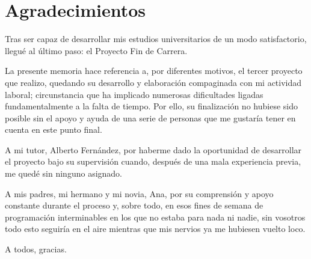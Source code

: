 \chapter{Agradecimientos}

Tras ser capaz de desarrollar mis estudios universitarios de un modo satisfactorio, llegué al último paso: el Proyecto Fin de Carrera.

La presente memoria hace referencia a, por diferentes motivos, el tercer proyecto que realizo, quedando su desarrollo y elaboración compaginada con mi actividad laboral; circunstancia que ha implicado numerosas dificultades ligadas fundamentalmente a la falta de tiempo. Por ello, su finalización no hubiese sido posible sin el apoyo y ayuda de una serie de personas que me gustaría tener en cuenta en este punto final.

A mi tutor, Alberto Fernández, por haberme dado la oportunidad de desarrollar el proyecto bajo su supervisión cuando, después de una mala experiencia previa, me quedé sin ninguno asignado.

A mis padres, mi hermano y mi novia, Ana, por su comprensión y apoyo constante durante el proceso y, sobre todo, en esos fines de semana de programación interminables en los que no estaba para nada ni nadie, sin vosotros todo esto seguiría en el aire mientras que mis nervios ya me hubiesen vuelto loco.

A todos, gracias.